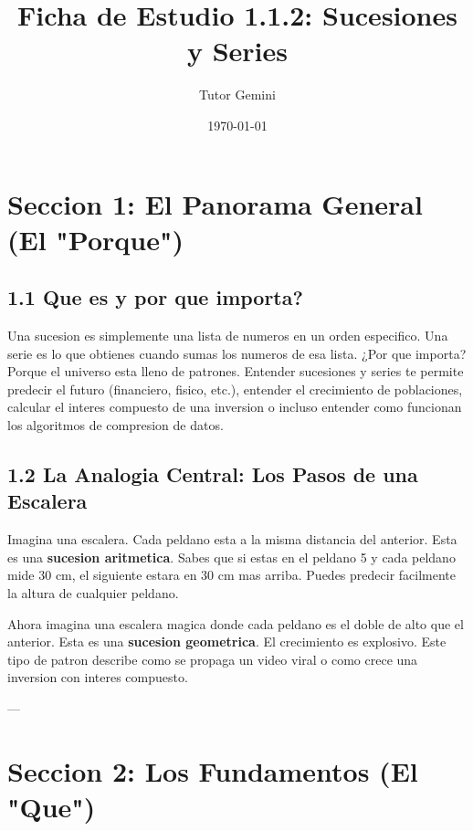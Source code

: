 \documentclass[12pt,a4paper]{article}
\title{\textbf{\Large Ficha de Estudio 1.1.2: Sucesiones y Series}}
\author{Tutor Gemini}
\date{\today}
\begin{document}
\maketitle

\section*{Seccion 1: El Panorama General (El "Porque")}

\subsection*{1.1 Que es y por que importa?}
Una sucesion es simplemente una lista de numeros en un orden especifico. Una serie es lo que obtienes cuando sumas los numeros de esa lista. ¿Por que importa? Porque el universo esta lleno de patrones. Entender sucesiones y series te permite predecir el futuro (financiero, fisico, etc.), entender el crecimiento de poblaciones, calcular el interes compuesto de una inversion o incluso entender como funcionan los algoritmos de compresion de datos.

\subsection*{1.2 La Analogia Central: Los Pasos de una Escalera}
Imagina una escalera. Cada peldano esta a la misma distancia del anterior. Esta es una \textbf{sucesion aritmetica}. Sabes que si estas en el peldano 5 y cada peldano mide 30 cm, el siguiente estara en 30 cm mas arriba. Puedes predecir facilmente la altura de cualquier peldano.

Ahora imagina una escalera magica donde cada peldano es el doble de alto que el anterior. Esta es una \textbf{sucesion geometrica}. El crecimiento es explosivo. Este tipo de patron describe como se propaga un video viral o como crece una inversion con interes compuesto.

---

\section*{Seccion 2: Los Fundamentos (El "Que")}
\end{document}
